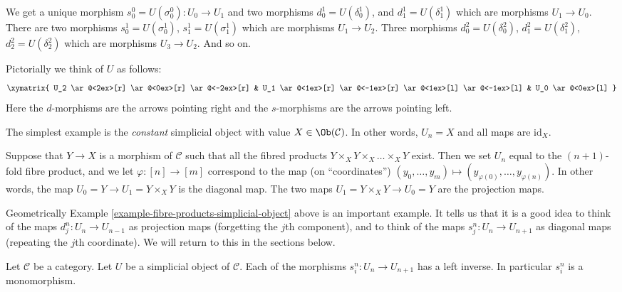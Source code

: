\noindent
We get a unique morphism $s^0_0 = U(\sigma^0_0) : U_0 \to U_1$ and
two morphisms $d^1_0 = U(\delta^1_0)$, and
$d^1_1 = U(\delta^1_1)$ which are morphisms $U_1 \to U_0$.
There are two morphisms $s^1_0 = U(\sigma^1_0)$, $s^1_1 = U(\sigma^1_1)$
which are morphisms $U_1 \to U_2$. Three morphisms
$d^2_0 = U(\delta^2_0)$, $d^2_1 = U(\delta^2_1)$, $d^2_2 = U(\delta^2_2)$
which are morphisms $U_3 \to U_2$. And so on.

\medskip\noindent
Pictorially we think of $U$ as follows:
$$
\xymatrix{
U_2
\ar@<2ex>[r]
\ar@<0ex>[r]
\ar@<-2ex>[r]
&
U_1
\ar@<1ex>[r]
\ar@<-1ex>[r]
\ar@<1ex>[l]
\ar@<-1ex>[l]
&
U_0
\ar@<0ex>[l]
}
$$
Here the $d$-morphisms are the arrows pointing right and the
$s$-morphisms are the arrows pointing left.

\begin{example}
\label{example-constant-simplicial-object}
The simplest example is the {\it constant} simplicial object with
value $X \in \Ob(\mathcal{C})$. In other words, $U_n = X$ and
all maps are $\text{id}_X$.
\end{example}

\begin{example}
\label{example-fibre-products-simplicial-object}
Suppose that $Y\to X$ is a morphism of $\mathcal{C}$ such that all
the fibred products $Y \times_X Y \times_X \ldots \times_X Y$ exist.
Then we set $U_n$ equal to the $(n + 1)$-fold fibre product,
and we let $\varphi : [n] \to [m]$ correspond to the map
(on ``coordinates'')
$(y_0, \ldots, y_m) \mapsto (y_{\varphi(0)}, \ldots, y_{\varphi(n)})$.
In other words, the map $U_0 = Y \to U_1 = Y \times_X Y$ is the
diagonal map. The two maps $U_1 = Y \times_X Y \to U_0 = Y$ are the
projection maps.
\end{example}

\noindent
Geometrically Example \ref{example-fibre-products-simplicial-object}
above is an important example. It tells us that it is a good
idea to think of the maps $d^n_j : U_n \to U_{n - 1}$
as projection maps (forgetting the $j$th component),
and to think of the maps $s^n_j : U_n \to U_{n + 1}$
as diagonal maps (repeating the $j$th coordinate).
We will return to this in the sections below.

\begin{lemma}
\label{lemma-si-injective}
Let $\mathcal{C}$ be a category.
Let $U$ be a simplicial object of $\mathcal{C}$.
Each of the morphisms $s^n_i : U_n \to U_{n + 1}$
has a left inverse. In particular $s^n_i$ is a monomorphism.
\end{lemma}

